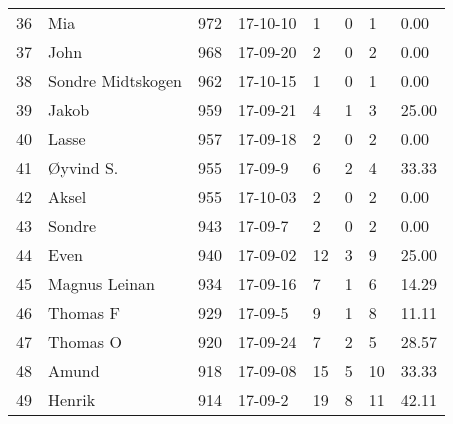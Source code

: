 \begin{longtable}{|r|l|r|l|l|l|l|l|}
36 &                  Mia &   972 &    17-10-10 &               1 &     0 &       1 &      0.00 \\
37 &                 John &   968 &    17-09-20 &               2 &     0 &       2 &      0.00 \\
38 &    Sondre Midtskogen &   962 &    17-10-15 &               1 &     0 &       1 &      0.00 \\
39 &                Jakob &   959 &    17-09-21 &               4 &     1 &       3 &     25.00 \\
40 &                Lasse &   957 &    17-09-18 &               2 &     0 &       2 &      0.00 \\
41 &            Øyvind S. &   955 &     17-09-9 &               6 &     2 &       4 &     33.33 \\
42 &                Aksel &   955 &    17-10-03 &               2 &     0 &       2 &      0.00 \\
43 &               Sondre &   943 &     17-09-7 &               2 &     0 &       2 &      0.00 \\
44 &                 Even &   940 &    17-09-02 &              12 &     3 &       9 &     25.00 \\
45 &        Magnus Leinan &   934 &    17-09-16 &               7 &     1 &       6 &     14.29 \\
46 &             Thomas F &   929 &     17-09-5 &               9 &     1 &       8 &     11.11 \\
47 &             Thomas O &   920 &    17-09-24 &               7 &     2 &       5 &     28.57 \\
48 &                Amund &   918 &    17-09-08 &              15 &     5 &      10 &     33.33 \\
49 &               Henrik &   914 &     17-09-2 &              19 &     8 &      11 &     42.11 \\
\end{longtable}
